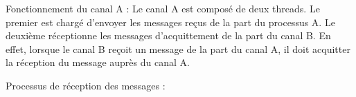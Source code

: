 \documentclass[a4paper, 10pt, french]{article}
\begin{document}
Fonctionnement du canal A :
Le canal A est composé de deux threads. Le premier est chargé d'envoyer les messages reçus de la part du processus A. Le deuxième réceptionne les messages d'acquittement de la part du canal B. En effet, lorsque le canal B reçoit un message de la part du canal A, il doit acquitter la réception du message auprès du canal A.

Processus de réception des messages : 
\end{document}
